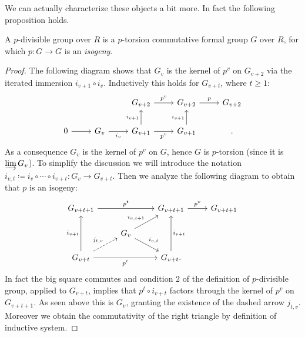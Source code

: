 \noindent
We can actually characterize these objects a bit more. 
In fact the following proposition holds.
\begin{prop}\label{CharactpDivGroups}%
	A $p$-divisible group over $R$ is a $p$-torsion
	commutative formal group $G$ over $R$,
	for which $p\colon G \to G$ is an {\em isogeny}.
\end{prop}
\begin{proof}
	The following diagram shows that $G_v$ is the kernel of $p^v$
	on $G_{v+2}$ via the iterated immersion $i_{v+1} \circ i_v$.
	Inductively this holds for $G_{v+t}$, where $t \geq 1$:
	\begin{equation*}
	\begin{tikzcd}
		&
		&
		G_{v+2} \arrow[r, "p^v", rightarrow] &
		G_{v+2} \arrow[r, "p", rightarrow] &
		G_{v+2}\\
		0 \arrow[r, "", rightarrow] &
		G_{v} \arrow[r, "i_v"', rightarrow] &
		G_{v+1} \arrow[r, "p^v"', rightarrow] 
		\arrow[u, "i_{v+1}", rightarrow] &
		G_{v+1} \arrow[u, "i_{v+1}", rightarrow] &
	.\end{tikzcd}
	\end{equation*}
	As a consequence $G_v$ is the kernel of $p^v$ on $G$,
	hence $G$ is $p$-torsion (since it is $\varinjlim G_v$).
	To simplify the discussion we will introduce the notation
	$i_{v,t} \coloneqq i_v \circ \cdots \circ i_{v+t}\colon G_v \to G_{v + t}$.
	Then we analyze the following diagram to obtain that $p$
	is an isogeny:
	\begin{equation}\label{diag:pDivCharProof}
	\begin{tikzcd}[row sep=1.4em]
		G_{v+t+1} \arrow[rr, "p^t", rightarrow] & &
		G_{v+t+1} \arrow[r, "p^v", rightarrow] &
		G_{v+t+1}\\
		&
		G_v \arrow[ru, "i_{v,t+1}", rightarrow] 
		\arrow[rd, "i_{v,t}", rightarrow] 
		& & \\
		G_{v+t} \arrow[ru, "j_{t,v}", dashrightarrow] 
		\arrow[rr, "p^t"', rightarrow]
		\arrow[uu, "i_{v+t}", rightarrow] & &
		G_{v+t} \arrow[uu, "i_{v+t}"', rightarrow]
	.\end{tikzcd}
	\end{equation}
	In fact the big square commutes and condition $2$ of the definition
	of $p$-divisible group, applied to $G_{v+t}$, implies that $p^t \circ i_{v+t}$
	factors through the kernel of $p^v$ on $G_{v+t+1}$.
	As seen above this is $G_v$, granting the existence of the 
	dashed arrow $j_{t,v}$.
	Moreover we obtain the commutativity of the right triangle by
	definition of inductive system.

\end{proof}
